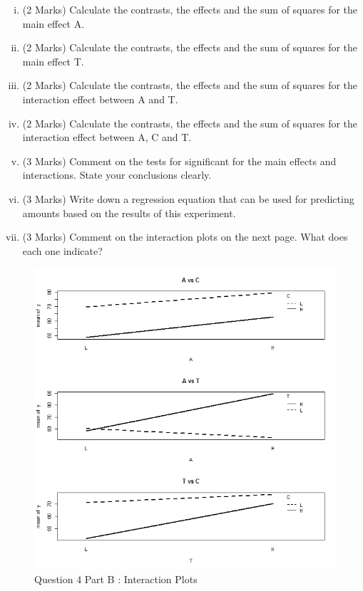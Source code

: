 \documentclass[a4paper,12pt]{article}
\begin{document}
{\begin{itemize}
	\begin{enumerate}[(i)]
		\item (2 Marks) Calculate the contrasts, the effects and the sum of squares for the main effect A. 
\item (2 Marks) Calculate the contrasts, the effects and the sum of squares for the main effect T. 
		\item (2 Marks) Calculate the contrasts, the effects and the sum of squares for the interaction effect between A and T.
		\item (2 Marks) Calculate the contrasts, the effects and the sum of squares for the interaction effect between A, C and T.
		
		\item (3 Marks) Comment on the tests for significant for the main effects and interactions. State your conclusions clearly.
		\item (3 Marks) Write down a regression equation that can be used for predicting amounts based on the results of this experiment.
		\item (3 Marks) Comment on the interaction plots on the next page. What does each one indicate?
\end{enumerate}
	
\end{itemize}	

\newpage
\begin{figure}[h!]
\centering
\includegraphics[width=1.1\linewidth]{images/Repeat2017-interactionplots}
\caption{Question 4 Part B : Interaction Plots}
\label{fig:Repeat2017-interactionplots}
\end{figure}








}
\end{document}
